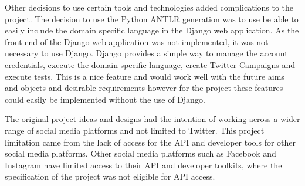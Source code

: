 Other decisions to use certain tools and technologies added complications to the project. The decision to use the Python ANTLR generation was to use be able to easily include the domain specific language in the Django web application. As the front end of the Django web application was not implemented, it was not necessary to use Django. Django provides a simple way to manage the account credentials, execute the domain specific language, create Twitter Campaigns and execute tests. This is a nice feature and would work well with the future aims and objects and desirable requirements however for the project these features could easily be implemented without the use of Django. \newline \par

The original project ideas and designs had the intention of working across a wider range of social media platforms and not limited to Twitter. This project limitation came from the lack of access for the API and developer tools for other social media platforms. Other social media platforms such as Facebook and Instagram have limited access to their API and developer toolkits, where the specification of the project was not eligible for API access. \newline \par